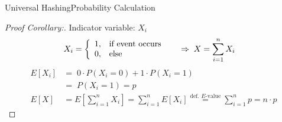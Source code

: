 \begin{frame}{Universal Hashing}{Probability Calculation}
  \begin{proof}[Proof Corollary:]
    Indicator variable: $X_i$\\
    \vspace*{-1.5em}
    \begin{align*}
      X_i &=
        \left\lbrace
          \begin{array}{ll}
            1, & \text{if event occurs}\\
            0, & \text{else}
          \end{array}
        \right. \hspace{1.5em}
        \Rightarrow \; X = \sum_{i=1}^{n} X_i
    \end{align*}
    \vspace*{-1.0em}
    \begin{align*}
      E[X_i]
        &= \; 0 \cdot P(X_i = 0) + 1 \cdot P(X_i = 1)\\
      {} &= \; P(X_i = 1) = p\\[0.5em]
      E[X] &= E\left[\sum_{i=1}^{n} X_i\right]
        = \sum_{i=1}^{n} E[X_i]
        \stackrel{\text{def. $E$-value}}{=}
        \sum_{i=1}^{n} p = n \cdot p
    \end{align*}
    \qedhere
  \end{proof}
\end{frame}
